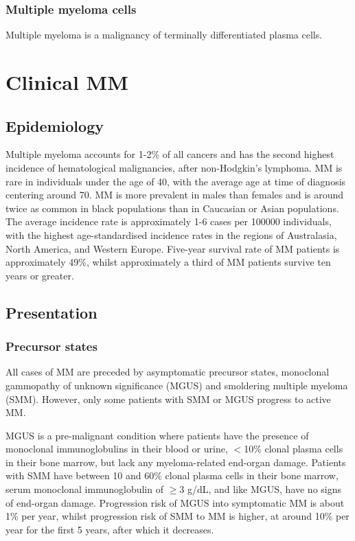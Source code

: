 \subsubsection{Multiple myeloma cells}
Multiple myeloma is a malignancy of terminally differentiated plasma cells.

\section{Clinical MM}

\subsection{Epidemiology}
Multiple myeloma accounts for 1-2\% of all cancers and has the second highest incidence of hematological malignancies, after non-Hodgkin's lymphoma\cite{international2003criteria}.
MM is rare in individuals under the age of 40, with the average age at time of diagnosis centering around 70\cite{tsang2019multiple, palumbo2011multiple}.
MM is more prevalent in males than females and is around twice as common in black populations than in Caucasian or Asian populations\cite{nhsmyeloma}.
The average incidence rate is approximately 1-6 cases per 100000 individuals\cite{tsang2019multiple, palumbo2011multiple, teras20162016}, with the highest age-standardised incidence rates in the regions of Australasia, North America, and Western Europe\cite{cowan2018global}.
Five-year survival rate of MM patients is approximately 49\%, whilst approximately a third of MM patients survive ten years or greater\cite{cancerresearchuk, siegel2016cancer}.

\subsection{Presentation}
\subsubsection{Precursor states}
All cases of MM are preceded by asymptomatic precursor states, monoclonal gammopathy of unknown significance (MGUS) and smoldering multiple myeloma (SMM).
However, only some patients with SMM or MGUS progress to active MM.

MGUS is a pre-malignant condition where patients have the presence of monoclonal immunoglobulins in their blood or urine, $<$10\% clonal plasma cells in their bone marrow, but lack any myeloma-related end-organ damage\cite{van2018mgus}.
Patients with SMM have between 10 and 60\% clonal plasma cells in their bone marrow, serum monoclonal immunoglobulin of $\ge$3 g/dL, and like MGUS, have no signs of end-organ damage\cite{rajkumar2015smoldering}.
Progression risk of MGUS into symptomatic MM is about 1\% per year, whilst progression risk of SMM to MM is higher, at around 10\% per year for the first 5 years, after which it decreases\cite{korde2011monoclonal, kyle2007clinical}.
%

